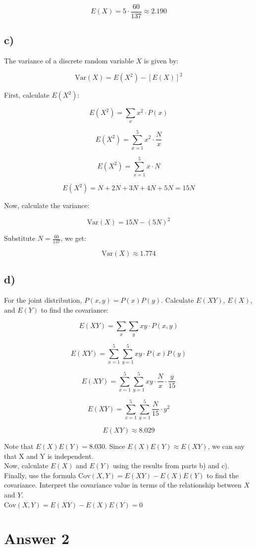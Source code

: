 \documentclass[12pt]{article}
\begin{document}
\[
E(X) = 5 \cdot \frac{60}{137} \approx 2.190
\]

\subsection*{c)}
The variance of a discrete random variable $X$ is given by:

\[
\text{Var}(X) = E(X^2) - [E(X)]^2
\]

First, calculate $E(X^2)$:

\[
E(X^2) = \sum_{x} x^2 \cdot P(x)
\]

\[
E(X^2) = \sum_{x=1}^{5} x^2 \cdot \frac{N}{x}
\]

\[
E(X^2) = \sum_{x=1}^{5} x \cdot N
\]

\[
E(X^2) = N + 2N + 3N + 4N + 5N = 15N
\]

Now, calculate the variance:

\[
\text{Var}(X) = 15N - (5N)^2
\]

Substitute $N = \frac{60}{137}$, we get:

\[
\text{Var}(X) \approx 1.774
\]

\subsection*{d)}
For the joint distribution, $P(x, y) = P(x)P(y)$. Calculate $E(XY)$, $E(X)$, and $E(Y)$ to find the covariance:

\[
E(XY) = \sum_{x}\sum_{y} xy \cdot P(x, y)
\]

\[
E(XY) = \sum_{x=1}^{5}\sum_{y=1}^{5} xy \cdot P(x)P(y)
\]

\[
E(XY) = \sum_{x=1}^{5}\sum_{y=1}^{5} xy \cdot \frac{N}{x} \cdot \frac{y}{15}
\]

\[
E(XY) =  \sum_{x=1}^{5}\sum_{y=1}^{5} \frac{N}{15} \cdot y^2
\]


\[
E(XY) \approx 8.029
\]

Note that $E(X)E(Y) =8.030 $. Since $E(X)E(Y) \approx E(XY)$, we can say that X and Y is independent. \\

Now, calculate $E(X)$ and $E(Y)$ using the results from parts b) and c). Finally, use the formula $\text{Cov}(X, Y) = E(XY) - E(X)E(Y)$ to find the covariance. Interpret the covariance value in terms of the relationship between $X$ and $Y$. \\

$\text{Cov}(X, Y) = E(XY) - E(X)E(Y) = 0$


\section*{Answer 2}
\end{document}
